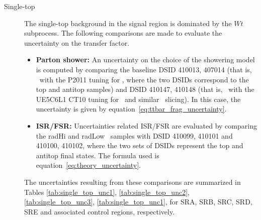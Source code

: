 \begin{description}
  

\item[Single-top] The single-top background in the signal region is dominated by the $Wt$ subprocess. The following comparisons are made to evaluate the uncertainty on the transfer factor. 

  \begin{itemize}
  \item {\bf Parton shower:} An uncertainty on the choice of the showering model is computed by comparing the baseline DSID 410013, 407014 (that is, \powheg\pythia\ with the P2011 tuning for \pythia, where the two DSIDs correspond to the top and antitop samples) and DSID 410147, 410148 (that is, \powheg\herwigpp\ with the UE5C6L1 CT10 tuning for \herwigpp\ and similar \met\ slicing). In this case, the uncertainty is given by equation~\ref{eq:ttbar_frag_uncertainty}.

  \item {\bf ISR/FSR:} Uncertainties related ISR/FSR are evaluated by comparing the radHi and radLow \powheg\pythia\ samples with DSID 410099, 410101 and 410100, 410102, where the two sets of DSIDs represent the top and antitop final states. The formula used is equation~\ref{eq:theory_uncertainty}.
  \end{itemize}

  The uncertainties resulting from these comparisons are summarized in Tables \ref{tab:single_top_unc1}, \ref{tab:single_top_unc2}, \ref{tab:single_top_unc3}, \ref{tab:single_top_unc1}, for SRA, SRB, SRC, SRD, SRE and associated control regions, respectively. 


\end{description}
